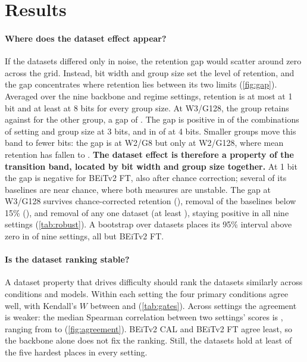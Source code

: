 \section{Results}
\label{sec:results}

\paragraph{Where does the dataset effect appear?}
If the datasets differed only in noise, the retention gap would scatter around zero across the grid.
Instead, bit width and group size set the level of retention, and the gap concentrates where retention lies between its two limits (\cref{fig:gap}).
Averaged over the nine backbone and regime settings, retention is at most  at 1 bit and at least  at 8 bits for every group size.
At W3/G128, the \SC{} group retains  against  for the other group, a gap of .
The gap is positive in  of the  combinations of setting and group size at 3 bits, and in  of  at 4 bits.
Smaller groups move this band to fewer bits: the gap is  at W2/G8 but only  at W2/G128, where mean retention has fallen to .
\textbf{The dataset effect is therefore a property of the transition band, located by bit width and group size together.}
At 1 bit the gap is negative for BEiTv2 FT, also after chance correction; several of its \SC{} baselines are near chance, where both measures are unstable.
The gap at W3/G128 survives chance-corrected retention (), removal of the  baselines below 15\% (), and removal of any one \SC{} dataset (at least ), staying positive in all nine settings (\cref{tab:robust}).
A bootstrap over datasets places its 95\% interval above zero in  of nine settings, all but BEiTv2 FT.


\paragraph{Is the dataset ranking stable?}
A dataset property that drives difficulty should rank the datasets similarly across conditions and models.
Within each setting the four primary conditions agree well, with Kendall's $W$ between  and  (\cref{tab:gates}).
Across settings the agreement is weaker: the median Spearman correlation between two settings' scores is , ranging from  to  (\cref{fig:agreement}).
BEiTv2 CAL and BEiTv2 FT agree least, so the backbone alone does not fix the ranking.
Still, the \SC{} datasets hold at least  of the five hardest places in every setting.

